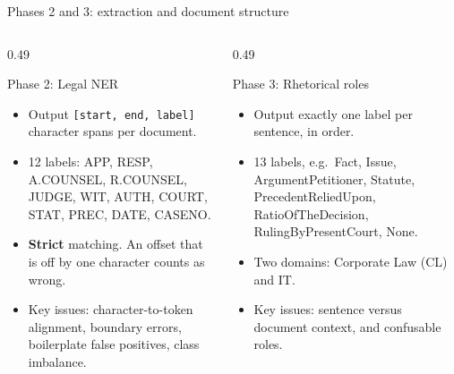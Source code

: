 \documentclass[aspectratio=169,11pt]{beamer}
\newcommand{\code}[1]{\texttt{\small #1}}
\begin{document}
\begin{frame}{Phases 2 and 3: extraction and document structure}
  \begin{columns}[T]
    \begin{column}{0.49\textwidth}
      \begin{block}{Phase 2: Legal NER}
        \small
        \begin{itemize}
          \item Output \code{[start, end, label]} character spans per document.
          \item 12 labels: APP, RESP, A.COUNSEL, R.COUNSEL, JUDGE, WIT, AUTH, COURT, STAT, PREC, DATE, CASENO.
          \item \textbf{Strict} matching. An offset that is off by one character counts as wrong.
          \item Key issues: character-to-token alignment, boundary errors, boilerplate false positives, class imbalance.
        \end{itemize}
      \end{block}
    \end{column}
    \begin{column}{0.49\textwidth}
      \begin{block}{Phase 3: Rhetorical roles}
        \small
        \begin{itemize}
          \item Output exactly one label per sentence, in order.
          \item 13 labels, e.g.\ Fact, Issue, ArgumentPetitioner, Statute, PrecedentReliedUpon, RatioOfTheDecision, RulingByPresentCourt, None.
          \item Two domains: Corporate Law (CL) and IT.
          \item Key issues: sentence versus document context, and confusable roles.
        \end{itemize}
      \end{block}
    \end{column}
  \end{columns}
\end{frame}
\end{document}
